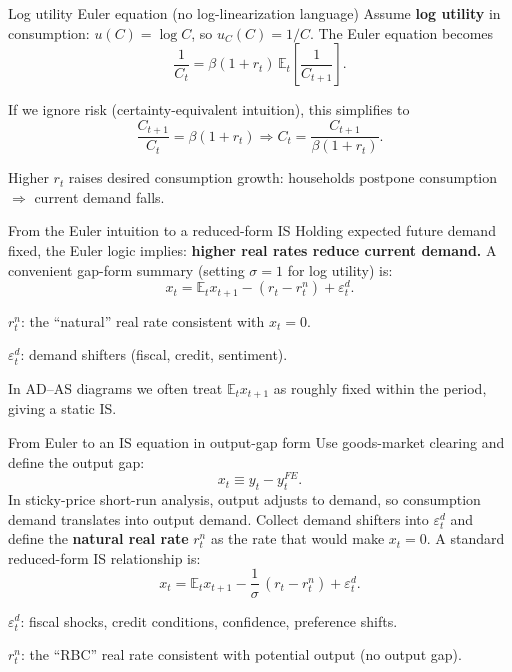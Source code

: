 \documentclass[aspectratio=169,xcolor=dvipsnames]{beamer}
\let\tempone\itemize
\let\temptwo\enditemize
\renewenvironment{itemize}{\tempone\addtolength{\itemsep}{\fill}}{\temptwo}
\begin{document}
\begin{frame}{Log utility Euler equation (no log-linearization language)}
\small
Assume \textbf{log utility} in consumption: $u(C)=\log C$, so $u_C(C)=1/C$.
The Euler equation becomes
\[
\frac{1}{C_t}=\beta(1+r_t)\,\mathbb{E}_t\left[\frac{1}{C_{t+1}}\right].
\]

\vspace{0.3em}
\begin{itemize}
\item If we ignore risk (certainty-equivalent intuition), this simplifies to
\[
\frac{C_{t+1}}{C_t}=\beta(1+r_t) \Rightarrow C_{t} = \frac{C_{t+1}}{ \beta (1 + r_{t})}.
\]
\item Higher $r_t$ raises desired consumption growth: households postpone consumption $\Rightarrow$ current demand falls.
\end{itemize}
\end{frame}

\begin{frame}{From the Euler intuition to a reduced-form IS}
\small
Holding expected future demand fixed, the Euler logic implies: \textbf{higher real rates reduce current demand.}
A convenient gap-form summary (setting $\sigma=1$ for log utility) is:
\[
x_t=\mathbb{E}_t x_{t+1}-(r_t-r_t^{n})+\varepsilon_t^{d}.
\]

\begin{itemize}
\item $r_t^{n}$: the ``natural'' real rate consistent with $x_t=0$.
\item $\varepsilon_t^{d}$: demand shifters (fiscal, credit, sentiment).
\item In AD--AS diagrams we often treat $\mathbb{E}_t x_{t+1}$ as roughly fixed within the period, giving a static IS.
\end{itemize}
\end{frame}

\begin{frame}{From Euler to an IS equation in output-gap form}
\small
Use goods-market clearing and define the output gap:
\[
x_t \equiv y_t-y_t^{FE}.
\]
In sticky-price short-run analysis, output adjusts to demand, so consumption demand translates into output demand.
Collect demand shifters into $\varepsilon_t^d$ and define the \textbf{natural real rate} $r_t^n$ as the rate that would make $x_t=0$.
A standard reduced-form IS relationship is:
\[
x_t=\mathbb{E}_t x_{t+1}-\frac{1}{\sigma}\,(r_t-r_t^n)+\varepsilon_t^d.
\]
\begin{itemize}
\item $\varepsilon_t^d$: fiscal shocks, credit conditions, confidence, preference shifts.
\item $r_t^n$: the ``RBC'' real rate consistent with potential output (no output gap).
\end{itemize}
\end{frame}
\end{document}
